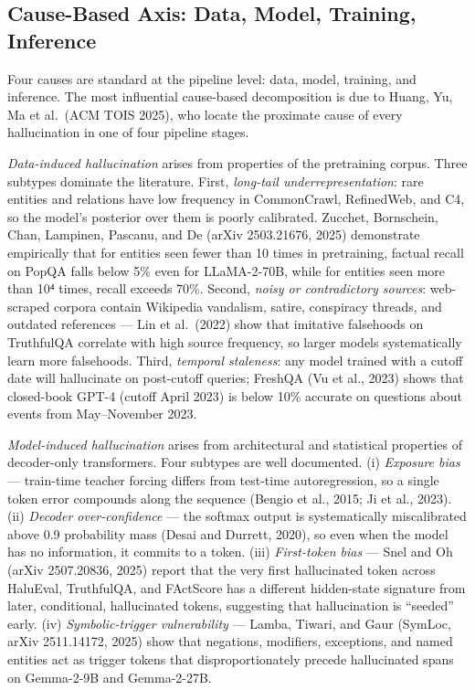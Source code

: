 \subsection{Cause-Based Axis: Data, Model, Training, Inference}\label{cause-based-axis-data-model-training-inference}

Four causes are standard at the pipeline level: data, model, training, and inference. The most influential cause-based decomposition is due to Huang, Yu, Ma et al.~(ACM TOIS 2025), who locate the proximate cause of every hallucination in one of four pipeline stages.

\emph{Data-induced hallucination} arises from properties of the pretraining corpus. Three subtypes dominate the literature. First, \emph{long-tail underrepresentation}: rare entities and relations have low frequency in CommonCrawl, RefinedWeb, and C4, so the model's posterior over them is poorly calibrated. Zucchet, Bornschein, Chan, Lampinen, Pascanu, and De (arXiv 2503.21676, 2025) demonstrate empirically that for entities seen fewer than 10 times in pretraining, factual recall on PopQA falls below 5\% even for LLaMA-2-70B, while for entities seen more than 10⁴ times, recall exceeds 70\%. Second, \emph{noisy or contradictory sources}: web-scraped corpora contain Wikipedia vandalism, satire, conspiracy threads, and outdated references --- Lin et al.~(2022) show that imitative falsehoods on TruthfulQA correlate with high source frequency, so larger models systematically learn more falsehoods. Third, \emph{temporal staleness}: any model trained with a cutoff date will hallucinate on post-cutoff queries; FreshQA (Vu et al., 2023) shows that closed-book GPT-4 (cutoff April 2023) is below 10\% accurate on questions about events from May--November 2023.

\emph{Model-induced hallucination} arises from architectural and statistical properties of decoder-only transformers. Four subtypes are well documented. (i) \emph{Exposure bias} --- train-time teacher forcing differs from test-time autoregression, so a single token error compounds along the sequence (Bengio et al., 2015; Ji et al., 2023). (ii) \emph{Decoder over-confidence} --- the softmax output is systematically miscalibrated above 0.9 probability mass (Desai and Durrett, 2020), so even when the model has no information, it commits to a token. (iii) \emph{First-token bias} --- Snel and Oh (arXiv 2507.20836, 2025) report that the very first hallucinated token across HaluEval, TruthfulQA, and FActScore has a different hidden-state signature from later, conditional, hallucinated tokens, suggesting that hallucination is ``seeded'' early. (iv) \emph{Symbolic-trigger vulnerability} --- Lamba, Tiwari, and Gaur (SymLoc, arXiv 2511.14172, 2025) show that negations, modifiers, exceptions, and named entities act as trigger tokens that disproportionately precede hallucinated spans on Gemma-2-9B and Gemma-2-27B.

